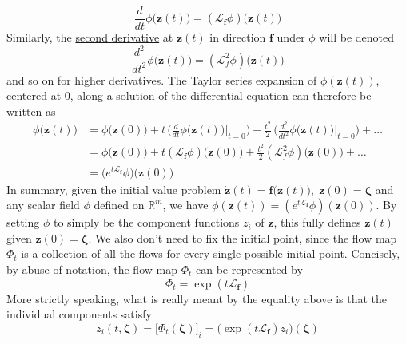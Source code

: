       \begin{equation}
        \frac{d}{dt} \phi\big(\mathbf{z}(t)\big) = ( \mathcal{L}_\mathbf{f} \phi) \big(\mathbf{z}(t) \big)
      \end{equation}
      Similarly, the \hyperref[mv-def:second-derivative]{second derivative} at $\mathbf{z}(t)$ in direction $\mathbf{f}$ under $\phi$ will be denoted 
      \begin{equation}
        \frac{d^2}{dt^2} \phi\big( \mathbf{z}(t) \big) = (\mathcal{L}_f^2 \phi) \big( \mathbf{z}(t) \big)
      \end{equation}
      and so on for higher derivatives. The Taylor series expansion of $\phi(\mathbf{z}(t))$, centered at $0$, along a solution of the differential equation can therefore be written as 
      \begin{align*}
        \phi \big(\mathbf{z}(t) \big) & = \phi \big(\mathbf{z}(0) \big) + t \, \bigg( \frac{d}{dt} \phi \big( \mathbf{z}(t)\big) \bigg|_{t = 0} \bigg) + \frac{t^2}{2} \, \bigg( \frac{d^2}{dt^2} \phi\big( \mathbf{z}(t)\big) \bigg|_{t = 0} \bigg) + \ldots \\
        & = \phi \big(\mathbf{z}(0) \big) + t (\mathcal{L}_\mathbf{f} \phi) \big( \mathbf{z}(0) \big) + \frac{t^2}{2} ( \mathcal{L}_f^2 \phi) \big( \mathbf{z}(0)\big) + \ldots \\
        & = \big( e^{t \mathcal{L}_\mathbf{f}} \phi) \big( \mathbf{z}(0)\big) 
      \end{align*}
      In summary, given the initial value problem $\mathbf{\dot{z}}(t) = \mathbf{f}\big( \mathbf{z}(t)\big), \; \mathbf{z}(0) = \boldsymbol{\zeta}$ and any scalar field $\phi$ defined on $\mathbb{R}^m$, we have $\phi( \mathbf{z}(t)) = ( e^{t \mathcal{L}_\mathbf{f}} \phi)(\mathbf{z}(0))$. By setting $\phi$ to simply be the component functions $z_i$ of $\mathbf{z}$, this fully defines $\mathbf{z}(t)$ given $\mathbf{z}(0) = \boldsymbol{\zeta}$. We also don't need to fix the initial point, since the flow map $\Phi_t$ is a collection of all the flows for every single possible initial point. Concisely, by abuse of notation, the flow map $\Phi_t$ can be represented by 
      \begin{equation}
        \Phi_t = \exp(t \mathcal{L}_\mathbf{f})
      \end{equation}
      More strictly speaking, what is really meant by the equality above is that the individual components satisfy 
      \begin{equation}
        z_i (t, \boldsymbol{\zeta}) = \big[ \Phi_t (\boldsymbol{\zeta}) \big]_i = \big(\exp(t \mathcal{L}_\mathbf{f}) z_i \big) (\boldsymbol{\zeta})
      \end{equation}
